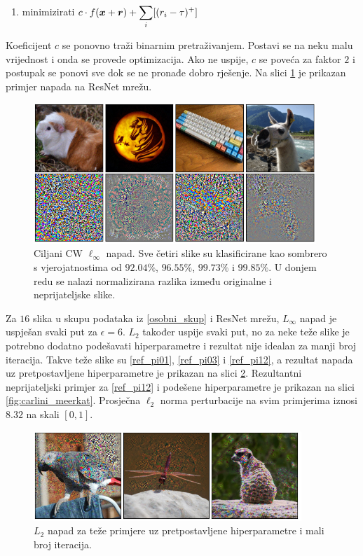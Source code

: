 \documentclass[utf8, diplomski]{fer}
\begin{document}
\begin{enumerate}[noitemsep, label=\textbullet]
  \item minimizirati $c \cdot f(\boldsymbol{x} + \boldsymbol{r}) + \smashoperator[r]{\sum_{i}} [(r_{i} - \tau )^{+}]$
\end{enumerate}

Koeficijent $c$ se ponovno traži binarnim pretraživanjem. Postavi se na neku malu vrijednost i onda se provede optimizacija. Ako ne uspije, $c$ se poveća za faktor $2$ i postupak se ponovi sve dok se ne pronađe dobro rješenje. Na slici \ref{fig:carlini_linf} je prikazan primjer napada na ResNet mrežu.

\begin{figure}[H]
\centering
\includegraphics[width=0.95\textwidth,keepaspectratio]{img/results/carlini_linf.png}
\caption{Ciljani CW $\ell_{\infty}$ napad. Sve četiri slike su klasificirane kao sombrero s vjerojatnostima od $92.04\%$, $96.55\%$, $99.73\%$ i $99.85\%$. U donjem redu se nalazi normalizirana razlika između originalne i neprijateljske slike.}
\label{fig:carlini_linf}
\end{figure}

Za $16$ slika u skupu podataka iz \ref{osobni_skup} i ResNet mrežu, $L_{\infty}$ napad je uspješan svaki put za $\epsilon = 6$. $L_{2}$ također uspije svaki put, no za neke teže slike je potrebno dodatno podešavati hiperparametre i rezultat nije idealan za manji broj iteracija. Takve teže slike su \ref{ref_pi01}, \ref{ref_pi03} i \ref{ref_pi12}, a rezultat napada uz pretpostavljene hiperparametre je prikazan na slici \ref{fig:carlini_fail}. Rezultantni neprijateljski primjer za \ref{ref_pi12} i podešene hiperparametre je prikazan na slici \ref{fig:carlini_meerkat}. Prosječna $\ell_{2}$ norma perturbacije na svim primjerima iznosi $8.32$ na skali $[0, 1]$.

\begin{figure}[H]
\centering
\includegraphics[width=0.9\textwidth,keepaspectratio]{img/results/carlini_fail.png}
\caption{$L_{2}$ napad za teže primjere uz pretpostavljene hiperparametre i mali broj iteracija.}
\label{fig:carlini_fail}
\end{figure}
\end{document}
